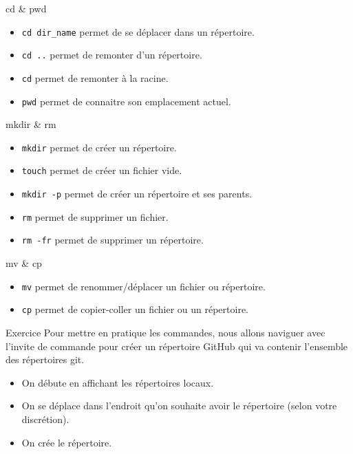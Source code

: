\documentclass[11pt]{beamer}
\begin{document}
\begin{frame}[fragile]{cd \& pwd}
	\begin{itemize}[<+->]
		\item \verb|cd dir_name| permet de se déplacer dans un répertoire.
		\item \verb|cd ..| permet de remonter d'un répertoire. 
		\item \verb|cd| permet de remonter à la racine.
		\item \verb|pwd| permet de connaitre son emplacement actuel.
	\end{itemize}
\end{frame}

\begin{frame}[fragile]{mkdir \& rm}
	\begin{itemize}[<+->]
		\item \verb|mkdir| permet de créer un répertoire.
		\item \verb|touch| permet de créer un fichier vide.
		\item \verb|mkdir -p| permet de créer un répertoire et ses parents.
		\item \verb|rm| permet de supprimer un fichier.
		\item \verb|rm -fr| permet de supprimer un répertoire.
	\end{itemize}
\end{frame}

\begin{frame}[fragile]{mv \& cp}
	\begin{itemize}[<+->]
		\item \verb|mv| permet de renommer/déplacer un fichier ou répertoire.
		\item \verb|cp| permet de copier-coller un fichier ou un répertoire.
	\end{itemize}
\end{frame}

\begin{frame}{Exercice}
	Pour mettre en pratique les commandes, nous allons naviguer avec l'invite de commande pour créer un répertoire GitHub qui va contenir l'ensemble des répertoires git. 
	
	\begin{itemize}
		\item On débute en affichant les répertoires locaux.
		\item On se déplace dans l'endroit qu'on souhaite avoir le répertoire (selon votre discrétion).
		\item On crée le répertoire.
	\end{itemize}
\end{frame}
\end{document}
